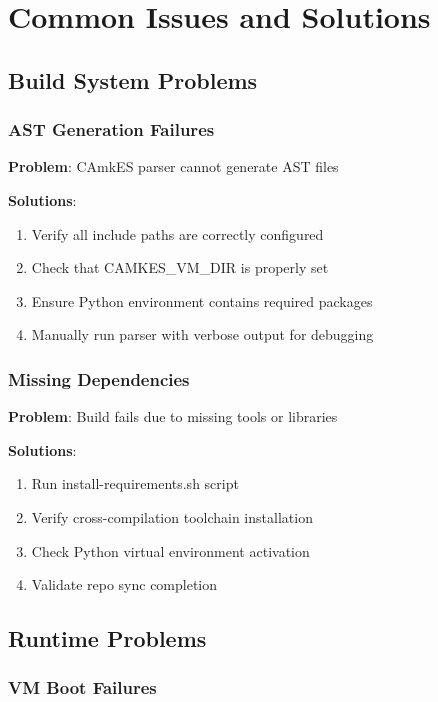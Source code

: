 \documentclass[11pt,a4paper]{article}
\begin{document}
\section{Common Issues and Solutions}

\subsection{Build System Problems}

\subsubsection{AST Generation Failures}

\textbf{Problem}: CAmkES parser cannot generate AST files

\textbf{Solutions}:
\begin{enumerate}
\item Verify all include paths are correctly configured
\item Check that CAMKES\_VM\_DIR is properly set
\item Ensure Python environment contains required packages
\item Manually run parser with verbose output for debugging
\end{enumerate}

\subsubsection{Missing Dependencies}

\textbf{Problem}: Build fails due to missing tools or libraries

\textbf{Solutions}:
\begin{enumerate}
\item Run install-requirements.sh script
\item Verify cross-compilation toolchain installation
\item Check Python virtual environment activation
\item Validate repo sync completion
\end{enumerate}

\subsection{Runtime Problems}

\subsubsection{VM Boot Failures}
\end{document}
